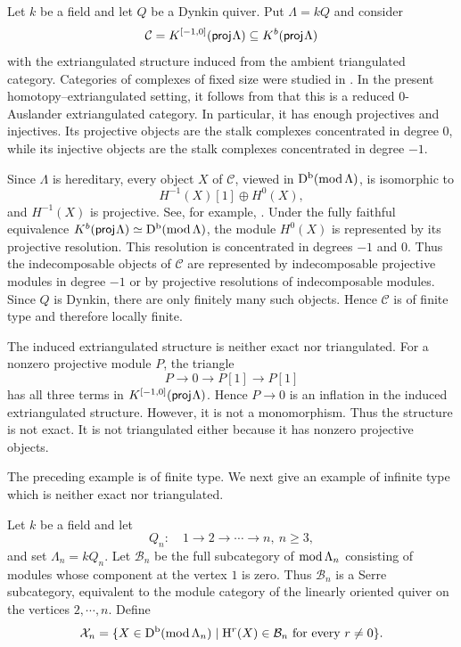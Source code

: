 \documentclass[11pt, twoside]{article}
\def\C{\mathcal{C}}
\numberwithin{equation}{section}
\def\proj{\mathsf{proj}\hspace{.01in}}
\begin{document}
\begin{example}\label{ex:two-term}
Let $k$ be a field and let $Q$ be a Dynkin quiver.  Put $\Lambda=kQ$ and consider
$$
 \C=K^{[-1,0]}(\proj\Lambda)
 \subseteq K^b(\proj\Lambda)
$$
with the extriangulated structure induced from the ambient triangulated
category.  Categories of complexes of fixed size were studied in
\cite{BautistaSoutoSalorioZuazua2005}.  In the present homotopy--extriangulated
setting, it follows from \cite[Section~3.3.3]{GorskyNakaokaPalu2023} that this
is a reduced $0$-Auslander extriangulated category.  In particular, it has
enough projectives and injectives.  Its projective objects are the stalk
complexes concentrated in degree $0$, while its injective objects are the
stalk complexes concentrated in degree $-1$.

Since $\Lambda$ is hereditary, every object $X$ of $\C$, viewed in
$\mathrm D^{\mathrm b}(\operatorname{mod}\Lambda)$, is isomorphic to
$$
 H^{-1}(X)[1]\oplus H^0(X),
$$
and $H^{-1}(X)$ is projective.  See, for example,
\cite[Chapter~I, Section~5]{Happel1988}.  Under the fully faithful equivalence
$K^b(\proj\Lambda)\simeq\Db(\modcat\Lambda)$, the module $H^0(X)$ is
represented by its projective resolution.  This resolution is concentrated in degrees
$-1$ and $0$.  Thus the indecomposable objects of $\C$ are represented by
indecomposable projective modules in degree $-1$ or by projective resolutions
of indecomposable modules.  Since $Q$ is Dynkin, there are only finitely many
such objects.  Hence $\C$ is of finite type and therefore locally finite.

The induced extriangulated structure is neither exact nor triangulated.
For a nonzero projective module $P$, the triangle
$$
 P\longrightarrow0\longrightarrow P[1]\longrightarrow P[1]
$$
has all three terms in $K^{[-1,0]}(\proj\Lambda)$.  Hence $P\to0$ is an
inflation in the induced extriangulated structure.  However, it is not a
monomorphism.  Thus the structure is not exact.  It is not triangulated
either because it has nonzero projective objects.
\end{example}


The preceding example is of finite type.  We next give an example of
infinite type which is neither exact nor triangulated.

Let $k$ be a field and let
\[
 Q_n:\quad 1\longrightarrow2\longrightarrow\cdots\longrightarrow n,
 ~ n\ge3,
\]
and set $\Lambda_n=kQ_n$.  Let $\mathcal B_n$ be the full subcategory of
$\operatorname{mod}\Lambda_n$ consisting of modules whose component at the vertex $1$
is zero.  Thus $\mathcal B_n$ is a Serre subcategory, equivalent to the
module category of the linearly oriented quiver on the vertices
$2,\cdots,n$.  Define
\[
 \mathcal X_n=
 \{X\in\mathrm D^{\mathrm b}(\operatorname{mod}\Lambda_n)\mid
   {\rm H}^r(X)\in\mathcal B_n\text{ for every }r\ne0\}.
\]
\end{document}
